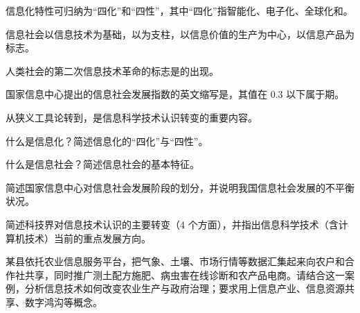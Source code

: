 \documentclass[a4paper,11pt]{article}
\begin{document}
\q 信息化特性可归纳为“四化”和“四性”，其中“四化”指智能化、电子化、全球化和\fillblanks[2.0cm]。

\q 信息社会以信息技术为基础，以\fillblanks[2.2cm]为支柱，以信息价值的生产为中心，以信息产品为标志。

\q 人类社会的第二次信息技术革命的标志是\fillblanks[2.6cm]的出现。

\q 国家信息中心提出的信息社会发展指数的英文缩写是\fillblanks[1.4cm]，其值在 0.3 以下属于\fillblanks[1.4cm]期。

\q 从狭义工具论转到\fillblanks[2.0cm]，是信息科学技术认识转变的重要内容。

\newpage
{}
\q 什么是信息化？简述信息化的“四化”与“四性”。\anslines{2.4cm}

\q 什么是信息社会？简述信息社会的基本特征。\anslines{2.4cm}

\q 简述国家信息中心对信息社会发展阶段的划分，并说明我国信息社会发展的不平衡状况。\anslines{2.4cm}

\q 简述科技界对信息技术认识的主要转变（4 个方面），并指出信息科学技术（含计算机技术）当前的重点发展方向。\anslines{2.4cm}

\newpage
{}
\q 某县依托农业信息服务平台，把气象、土壤、市场行情等数据汇集起来向农户和合作社共享，同时推广测土配方施肥、病虫害在线诊断和农产品电商。请结合这一案例，分析信息技术如何改变农业生产与政府治理；要求用上信息产业、信息资源共享、数字鸿沟等概念。\anslines{5cm}
\end{document}
